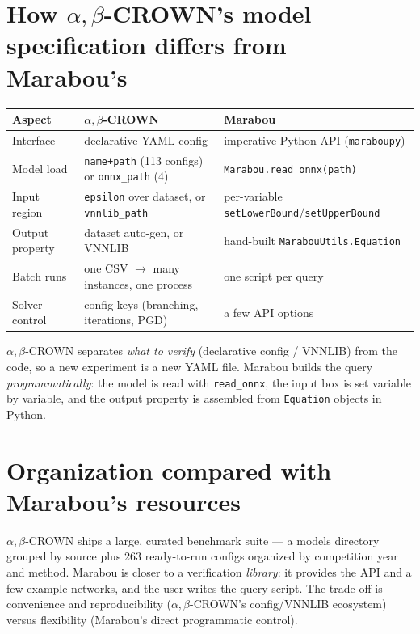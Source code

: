 \documentclass[10pt]{article}
\newcommand{\abc}{$\alpha,\beta$-CROWN}
\begin{document}
\section{How \abc{}'s model specification differs from Marabou's}
\begin{table}[H]\centering\small
\begin{tabular}{lll}
\toprule
Aspect & \abc{} & Marabou \\
\midrule
Interface & declarative YAML config & imperative Python API (\texttt{maraboupy}) \\
Model load & \texttt{name+path} (113 configs) or \texttt{onnx\_path} (4) & \texttt{Marabou.read\_onnx(path)} \\
Input region & \texttt{epsilon} over dataset, or \texttt{vnnlib\_path} & per-variable \texttt{setLowerBound}/\texttt{setUpperBound} \\
Output property & dataset auto-gen, or VNNLIB & hand-built \texttt{MarabouUtils.Equation} \\
Batch runs & one CSV $\to$ many instances, one process & one script per query \\
Solver control & config keys (branching, iterations, PGD) & a few API options \\
\bottomrule
\end{tabular}
\end{table}

\abc{} separates \emph{what to verify} (declarative config / VNNLIB) from the code, so a new
experiment is a new YAML file. Marabou builds the query \emph{programmatically}: the model is
read with \texttt{read\_onnx}, the input box is set variable by variable, and the output
property is assembled from \texttt{Equation} objects in Python.

\section{Organization compared with Marabou's resources}
\abc{} ships a large, curated benchmark suite --- a models directory grouped by source plus
263 ready-to-run configs organized by competition year and method. Marabou is closer to a
verification \emph{library}: it provides the API and a few example networks, and the user
writes the query script. The trade-off is convenience and reproducibility (\abc{}'s
config/VNNLIB ecosystem) versus flexibility (Marabou's direct programmatic control).
\end{document}
